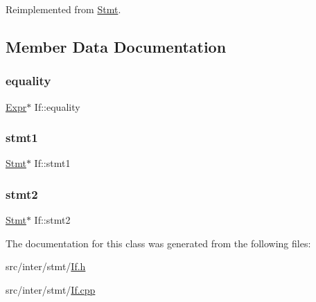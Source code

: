 Reimplemented from \hyperlink{class_stmt_abdc3261770c3c5bd3ce5b3ba6eedfaa4}{Stmt}.



\subsection{Member Data Documentation}
\mbox{\label{class_if_a84f2d73109cd8030fcc244ef741b5803}} 
\subsubsection{\texorpdfstring{equality}{equality}}
{\footnotesize\ttfamily \hyperlink{class_expr}{Expr}$\ast$ If\+::equality\hspace{0.3cm}{\ttfamily [protected]}}

\mbox{\label{class_if_a3ece7870e5d5b11dd42457e22af00a72}} 
\subsubsection{\texorpdfstring{stmt1}{stmt1}}
{\footnotesize\ttfamily \hyperlink{class_stmt}{Stmt}$\ast$ If\+::stmt1\hspace{0.3cm}{\ttfamily [protected]}}

\mbox{\label{class_if_aaf8a095b5a986832928ebdcdb263d41c}} 
\subsubsection{\texorpdfstring{stmt2}{stmt2}}
{\footnotesize\ttfamily \hyperlink{class_stmt}{Stmt}$\ast$ If\+::stmt2\hspace{0.3cm}{\ttfamily [protected]}}



The documentation for this class was generated from the following files\+:\begin{DoxyCompactItemize}
\item 
src/inter/stmt/\hyperlink{_if_8h}{If.\+h}\item 
src/inter/stmt/\hyperlink{_if_8cpp}{If.\+cpp}\end{DoxyCompactItemize}
